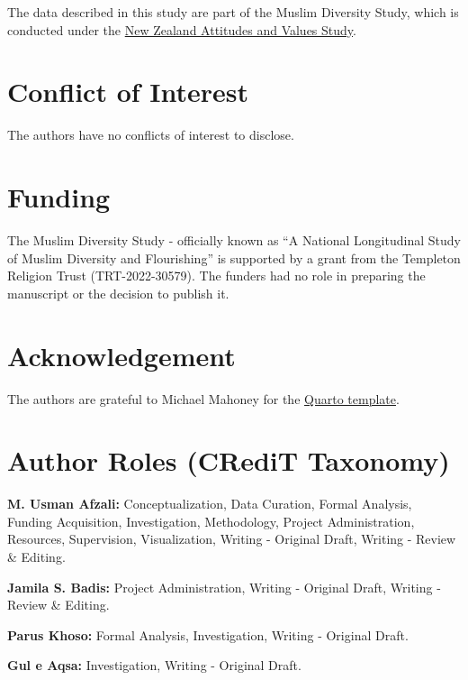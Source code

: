 \documentclass[
]{interact}
\begin{document}
The data described in this study are part of the Muslim Diversity Study,
which is conducted under the \href{https://osf.io/75snb/}{New Zealand
Attitudes and Values Study}.

\newpage{}

\section{Conflict of Interest}\label{conflict-of-interest}

The authors have no conflicts of interest to disclose.

\newpage{}

\section{Funding}\label{funding}

The Muslim Diversity Study - officially known as ``A National
Longitudinal Study of Muslim Diversity and Flourishing'' is supported by
a grant from the Templeton Religion Trust (TRT-2022-30579). The funders
had no role in preparing the manuscript or the decision to publish it.

\newpage{}

\section{Acknowledgement}\label{acknowledgement}

The authors are grateful to Michael Mahoney for the
\href{https://github.com/mikemahoney218/quarto-tandf}{Quarto template}.

\newpage{}

\section{Author Roles (CRediT
Taxonomy)}\label{author-roles-credit-taxonomy}

\textbf{M. Usman Afzali:} Conceptualization, Data Curation, Formal
Analysis, Funding Acquisition, Investigation, Methodology, Project
Administration, Resources, Supervision, Visualization, Writing -
Original Draft, Writing - Review \& Editing.

\textbf{Jamila S. Badis:} Project Administration, Writing - Original
Draft, Writing - Review \& Editing.

\textbf{Parus Khoso:} Formal Analysis, Investigation, Writing - Original
Draft.

\textbf{Gul e Aqsa:} Investigation, Writing - Original Draft.
\end{document}
